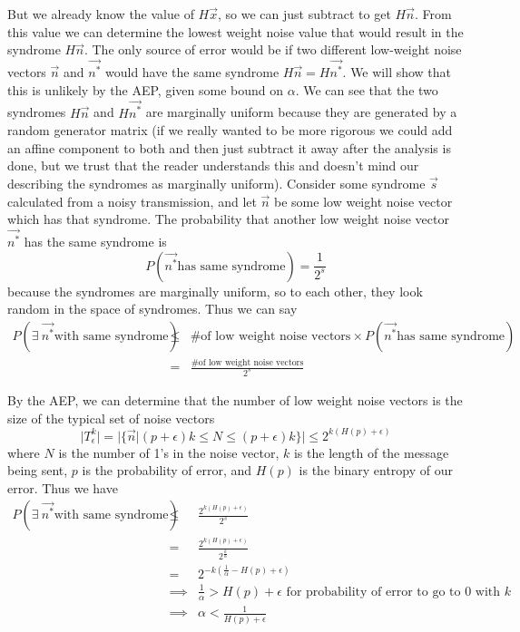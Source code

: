 \documentclass[11pt]{article}
\begin{document}
\begin{enumerate}
\begin{enumerate}
        But we already know the value of $H\vec{x}$, so we can just subtract to get $H\vec{n}$. From this value we can determine the lowest weight noise value that would result in the syndrome $H\vec{n}$. The only source of error would be if two different low-weight noise vectors $\vec{n}$ and $\vec{n^*}$ would have the same syndrome $H\vec{n} = H\vec{n^*}$. We will show that this is unlikely by the AEP, given some bound on $\alpha$. We can see that the two syndromes $H\vec{n}$ and $H\vec{n^*}$ are marginally uniform because they are generated by a random generator matrix (if we really wanted to be more rigorous we could add an affine component to both and then just subtract it away after the analysis is done, but we trust that the reader understands this and doesn't mind our describing the syndromes as marginally uniform). Consider some syndrome $\vec{s}$ calculated from a noisy transmission, and let $\vec{n}$ be some low weight noise vector which has that syndrome. The probability that another low weight noise vector $\vec{n^*}$ has the same syndrome is
        \begin{equation*}
         P(\vec{n^*}\text{has same syndrome}) = \frac{1}{2^s}
        \end{equation*}
        because the syndromes are marginally uniform, so to each other, they look random in the space of syndromes. Thus we can say
        \begin{eqnarray*}
        P(\exists \ \vec{n^*}\text{with same syndrome}) &\leq& \text{\# of low weight noise vectors}\times P(\vec{n^*}\text{has same syndrome}) \\
        &=& \frac{\text{\# of low weight noise vectors}}{2^s}
        \end{eqnarray*}
        
        By the AEP, we can determine that the number of low weight noise vectors is the size of the typical set of noise vectors
        \begin{equation*}
        \vert T_\epsilon^k \vert = \vert \{\vec{n} \vert (p + \epsilon)k \leq N \leq (p+\epsilon)k\}\vert \leq 2^{k(H(p) + \epsilon)}
        \end{equation*}
         where $N$ is the number of 1's in the noise vector, $k$ is the length of the message being sent, $p$ is the probability of error, and $H(p)$ is the binary entropy of our error. Thus we have
        \begin{eqnarray*}
         P(\exists \ \vec{n^*}\text{with same syndrome}) &\leq& \frac{2^{k(H(p) + \epsilon)}}{2^s}\\
         &=&  \frac{2^{k(H(p) + \epsilon)}}{2^{\frac{k}{\alpha}}}\\
         &=& 2^{-k(\frac{1}{\alpha} - H(p) + \epsilon)}\\
         &\implies& \frac{1}{\alpha} > H(p) + \epsilon \text{ for probability of error to go to 0 with $k$}\\
         &\implies& \alpha < \frac{1}{H(p) + \epsilon}
         \end{eqnarray*}


\end{enumerate}
\end{enumerate}
\end{document}
